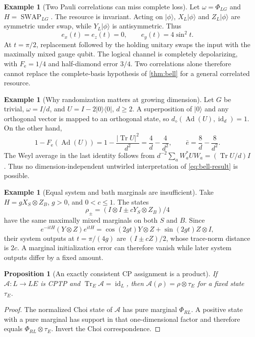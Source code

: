 \documentclass[11pt,reqno]{amsart}
\numberwithin{equation}{section}
\newtheorem{proposition}[theorem]{Proposition}
\theoremstyle{definition}
\newtheorem{example}[theorem]{Example}
\theoremstyle{remark}
\newcommand{\Tr}{\operatorname{Tr}}
\newcommand{\id}{\operatorname{id}}
\newcommand{\Ad}{\operatorname{Ad}}
\newcommand{\Fe}{F_{\mathrm e}}
\newcommand{\diam}{d_\diamond}
\begin{document}
\begin{example}[Two Pauli correlations can miss complete loss]
\label{ex:two-paulis}
Let \(\omega=\Phi_{LG}\) and \(H=\operatorname{SWAP}_{LG}\).
The resource is invariant. Acting on \(|\phi\rangle\),
\(X_L|\phi\rangle\) and \(Z_L|\phi\rangle\) are symmetric under
swap, while \(Y_L|\phi\rangle\) is antisymmetric. Thus
\[
 e_x(t)=e_z(t)=0,\qquad e_y(t)=4\sin^2t.
\]
At \(t=\pi/2\), replacement followed by the holding unitary swaps the
input with the maximally mixed gauge qubit. The logical channel is
completely depolarizing, with \(\Fe=1/4\) and half-diamond error \(3/4\).
Two correlations alone therefore cannot replace the complete-basis
hypothesis of \cref{thm:bell} for a general correlated resource.
\end{example}

\begin{example}[Why randomization matters at growing dimension]
\label{ex:dimension}
Let \(G\) be trivial, \(\omega=I/d\), and
\(U=I-2|0\rangle\langle0|\), \(d\ge2\). A superposition of
\(|0\rangle\) and any orthogonal vector is mapped to an orthogonal
state, so \(\diam(\Ad(U),\id_d)=1\).
On the other hand,
\[
 1-\Fe(\Ad(U))
       =1-\frac{|\Tr U|^2}{d^2}=\frac4d-\frac4{d^2},
 \qquad \bar e=\frac8d-\frac8{d^2}.
\]
The Weyl average in the last identity follows from
\(d^{-2}\sum_aW_a^*UW_a=(\Tr U/d)I\).
Thus no dimension-independent untwirled interpretation of
\eqref{eq:bell-result} is possible.
\end{example}

\begin{example}[Equal system and bath marginals are insufficient]
\label{ex:marginals}
Take \(H=gX_S\otimes Z_B\), \(g>0\), and \(0<c\le1\). The states
\[
            \rho_\pm=(I\otimes I\pm cY_S\otimes Z_B)/4
\]
have the same maximally mixed marginals on both \(S\) and \(B\).
Since
\[
 e^{-itH}(Y\otimes Z)e^{itH}
       =\cos(2gt)Y\otimes Z+\sin(2gt)Z\otimes I,
\]
their system outputs at \(t=\pi/(4g)\) are
\((I\pm cZ)/2\), whose trace-norm distance is \(2c\).
A marginal initialization error can therefore vanish while later
system outputs differ by a fixed amount.
\end{example}

\begin{proposition}[An exactly consistent CP assignment is a product]
\label{prop:assignment}
If \(\mathcal A:L\to L E\) is CPTP and
\(\Tr_E\mathcal A=\id_L\), then
\(\mathcal A(\rho)=\rho\otimes\tau_E\) for a fixed state \(\tau_E\).
\end{proposition}
\begin{proof}
The normalized Choi state of \(\mathcal A\) has pure marginal \(\Phi_{RL}\).
A positive state with a pure marginal has support in that
one-dimensional factor and therefore equals \(\Phi_{RL}\otimes\tau_E\).
Invert the Choi correspondence.
\end{proof}
\end{document}
